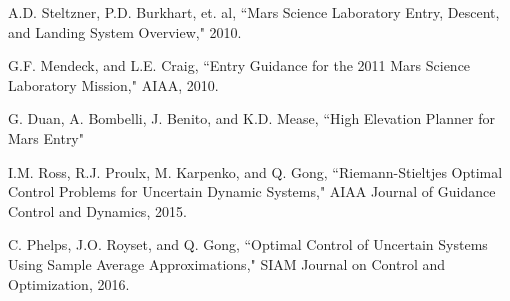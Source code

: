 \documentclass[10pt,a4paper]{article}
\begin{document}
	\begin{thebibliography}{1}
		

		A.D. Steltzner, P.D. Burkhart, et. al, ``Mars Science Laboratory Entry, Descent, and Landing System Overview," 2010.
				
		G.F. Mendeck, and L.E. Craig, ``Entry Guidance for the 2011 Mars Science Laboratory Mission," AIAA, 2010.
		
		G. Duan, A. Bombelli, J. Benito, and K.D. Mease, ``High Elevation Planner for Mars Entry"
		
		I.M. Ross, R.J. Proulx, M. Karpenko, and Q. Gong, ``Riemann-Stieltjes Optimal Control Problems for Uncertain Dynamic Systems," AIAA Journal of Guidance Control and Dynamics, 2015.
		
		C. Phelps, J.O. Royset, and Q. Gong, ``Optimal Control of Uncertain Systems Using Sample Average Approximations," SIAM Journal on Control and Optimization, 2016.
	\end{thebibliography}
\end{document}
